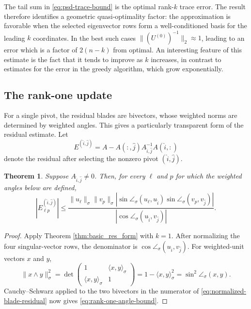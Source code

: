 \documentclass[11pt, preprint]{article}
\newtheorem{theorem}{Theorem}[section]
\newcommand{\inner}[1]{\langle #1\rangle}
\begin{document}
The tail sum in \eqref{eq:psd-trace-bound} is the optimal rank-$k$ trace error. The result therefore identifies a geometric quasi-optimality factor: the approximation is favorable when the selected eigenvector rows form a well-conditioned basis for the leading $k$ coordinates. In the best such cases $\|(U^{(0)})^{-1}\|_2\approx 1$, leading to an error which is a factor of $2(n-k)$ from optimal. An interesting feature of this estimate is the fact that it tends to improve as $k$ increases, in contrast to estimates for the error in the greedy algorithm, which grow exponentially. 

 
\subsection{The rank-one update}\label{sec:single_bound}

For a single pivot, the residual blades are bivectors, whose weighted norms
are determined by weighted angles. This gives a particularly transparent
form of the residual estimate. 
Let
\[
E^{(\widehat i,\widehat j)}
=
A-A(:,\widehat j)A_{\widehat i,\widehat j}^{-1}A(\widehat i,:)
\]
denote the residual after selecting the nonzero pivot
$(\widehat i,\widehat j)$.

\begin{theorem}\label{thm:single_iter_cos_bound}
Suppose $A_{\widehat i,\widehat j}\neq0$. Then, for every $\ell$ and $p$
for which the weighted angles below are defined,
\begin{equation}\label{eq:rank-one-angle-bound}
\left|E^{(\widehat i,\widehat j)}_{\ell p}\right|
\leq
\frac{
\|u_\ell\|_\sigma\|v_p\|_\sigma
\left|\sin\angle_\sigma(u_\ell,u_{\widehat i})\sin\angle_\sigma(v_p,v_{\widehat j})\right|
}{
\left|\cos\angle_\sigma(u_{\widehat i},v_{\widehat j})\right|
}.
\end{equation}
\end{theorem}

\begin{proof}
Apply Theorem \ref{thm:basic_res_form} with $k=1$. After normalizing the
four singular-vector rows, the denominator is
$\cos\angle_\sigma(u_{\widehat i},v_{\widehat j})$. For weighted-unit
vectors $x$ and $y$,
\[
\|x\wedge y\|_\sigma^2
=
\det
\begin{pmatrix}
1 & \inner{x,y}_\sigma\\
\inner{x,y}_\sigma & 1
\end{pmatrix}
=
1-\inner{x,y}_\sigma^2
=
\sin^2\angle_\sigma(x,y).
\]
Cauchy--Schwarz applied to the two bivectors in the numerator of
\eqref{eq:normalized-blade-residual} now gives
\eqref{eq:rank-one-angle-bound}.
\end{proof}
\end{document}
